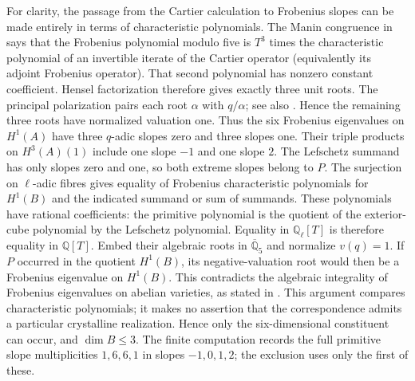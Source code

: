 For clarity, the passage from the Cartier calculation to
Frobenius slopes can be made entirely in terms of characteristic
polynomials.  The Manin congruence in
\cite[\S2.5, p.~7; Cartier formula in \S3.1, pp.~7--8]{DGJ_AchterHowe2018}
says that the Frobenius polynomial modulo five is $T^3$ times
the characteristic polynomial of an invertible iterate of the
Cartier operator (equivalently its adjoint Frobenius operator).
That second polynomial has nonzero constant coefficient.
Hensel factorization therefore gives exactly three unit roots.
The principal polarization pairs each root $\alpha$ with
$q/\alpha$; see also \cite[Lemma 19.2, p.~41]{DGJ_MilneAV}.
Hence the remaining three roots have normalized valuation one.
Thus the six Frobenius eigenvalues on $H^1(A)$ have three
$q$-adic slopes zero and three slopes one.  Their triple
products on $H^3(A)(1)$ include one slope $-1$ and one slope $2$.
The Lefschetz summand has only slopes zero and one, so both
extreme slopes belong to $P$.  The surjection on $\ell$-adic fibres gives equality of
Frobenius characteristic polynomials for $H^1(B)$ and the
indicated summand or sum of summands.  These polynomials have
rational coefficients: the primitive polynomial is the quotient
of the exterior-cube polynomial by the Lefschetz polynomial.
Equality in $\mathbb Q_\ell[T]$ is therefore equality in
$\mathbb Q[T]$.  Embed their algebraic roots in
$\overline{\mathbb Q}_5$ and normalize $v(q)=1$.
If $P$ occurred in the quotient $H^1(B)$, its negative-valuation
root would then be a Frobenius eigenvalue on $H^1(B)$.  This
contradicts the algebraic integrality of Frobenius eigenvalues
on abelian varieties, as stated in
\cite[Theorem 19.1 and its proof, pp.~40--41]{DGJ_MilneAV}.
This argument compares characteristic polynomials; it makes no
assertion that the correspondence admits a particular crystalline
realization.  Hence only the
six-dimensional constituent can occur, and $\dim B\leq3$.
The finite computation records the full primitive slope
multiplicities $1,6,6,1$ in slopes $-1,0,1,2$; the exclusion uses
only the first of these.

